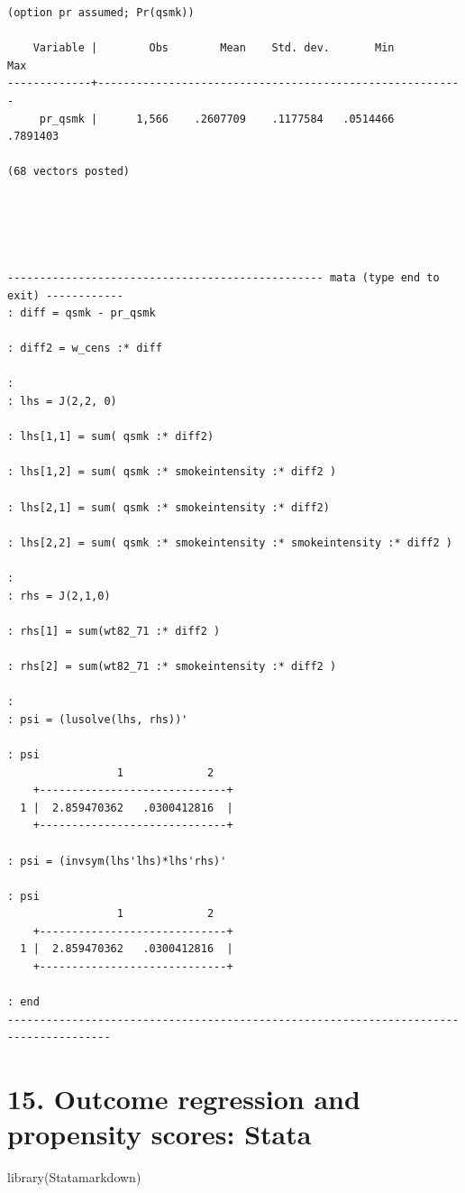 \documentclass[
  10pt,
  a4paper,
]{book}
\newenvironment{Shaded}{\begin{snugshade}}{\end{snugshade}}
\newcommand{\FunctionTok}[1]{\textcolor[rgb]{0.28,0.35,0.67}{#1}}
\newcommand{\NormalTok}[1]{\textcolor[rgb]{0.00,0.46,0.62}{#1}}
\begin{document}
\begin{verbatim}
(option pr assumed; Pr(qsmk))

    Variable |        Obs        Mean    Std. dev.       Min        Max
-------------+---------------------------------------------------------
     pr_qsmk |      1,566    .2607709    .1177584   .0514466   .7891403

(68 vectors posted)





------------------------------------------------- mata (type end to exit) ------------
: diff = qsmk - pr_qsmk

: diff2 = w_cens :* diff

: 
: lhs = J(2,2, 0)

: lhs[1,1] = sum( qsmk :* diff2)

: lhs[1,2] = sum( qsmk :* smokeintensity :* diff2 )

: lhs[2,1] = sum( qsmk :* smokeintensity :* diff2)

: lhs[2,2] = sum( qsmk :* smokeintensity :* smokeintensity :* diff2 )

:                                                                 
: rhs = J(2,1,0)

: rhs[1] = sum(wt82_71 :* diff2 )

: rhs[2] = sum(wt82_71 :* smokeintensity :* diff2 )

: 
: psi = (lusolve(lhs, rhs))'

: psi
                 1             2
    +-----------------------------+
  1 |  2.859470362   .0300412816  |
    +-----------------------------+

: psi = (invsym(lhs'lhs)*lhs'rhs)'

: psi
                 1             2
    +-----------------------------+
  1 |  2.859470362   .0300412816  |
    +-----------------------------+

: end
--------------------------------------------------------------------------------------
\end{verbatim}

\chapter*{15. Outcome regression and propensity scores: Stata}\label{outcome-regression-and-propensity-scores-stata}

\begin{Shaded}
\begin{Highlighting}[]
\FunctionTok{library}\NormalTok{(Statamarkdown)}
\end{Highlighting}
\end{Shaded}
\end{document}
